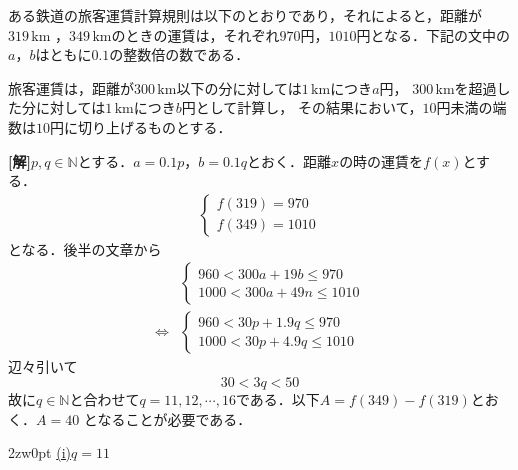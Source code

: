 \documentclass[a4j]{jarticle}
\begin{document}

     \begin{oframed}
     ある鉄道の旅客運賃計算規則は以下のとおりであり，それによると，距離が$319\,\mathrm{km}$
     ，$349\,\mathrm{km}$のときの運賃は，それぞれ$970$円，$1010$円となる．下記の文中の
     $a$，$b$はともに$0.1$の整数倍の数である．
     
     旅客運賃は，距離が$300\,\mathrm{km}$以下の分に対しては$1\,\mathrm{km}$につき$a$円，
     $300\,\mathrm{km}$を超過した分に対しては$1\,\mathrm{km}$につき$b$円として計算し，
     その結果において，$10$円未満の端数は$10$円に切り上げるものとする．
     \end{oframed}

\setlength{\columnseprule}{0.4pt}
\begin{multicols}{2}
{\bf[解]}$p,q\in\mathbb{N}$とする．$a=0.1p$，$b=0.1q$とおく．距離$x$の時の運賃を$f(x)$とする．
     \begin{align*}
     \left\{
          \begin{array}{l}
          f(319)=970 \\
          f(349)=1010
          \end{array}
     \right.
     \end{align*}
となる．後半の文章から
     \begin{align*}
     &\left\{
          \begin{array}{l}
          960<300a+19b\le970 \\
          1000<300a+49n\le1010
          \end{array}
     \right.\\
     \Longleftrightarrow
     &\left\{
          \begin{array}{l}
          960<30p+1.9q\le970 \\
          1000<30p+4.9q\le1010
          \end{array}
     \right.     
     \end{align*}
辺々引いて
     \[30<3q<50\]
故に$q\in\mathbb{N}$と合わせて$q=11,12,\cdots,16$である．以下$A=f(349)-f(319)$とおく．$A=40$
となることが必要である．
     \begin{indentation}{2zw}{0pt}
     \noindent\underline{(i)$q=11$}
     \end{indentation}
          
\newpage
\end{multicols}
\end{document}
